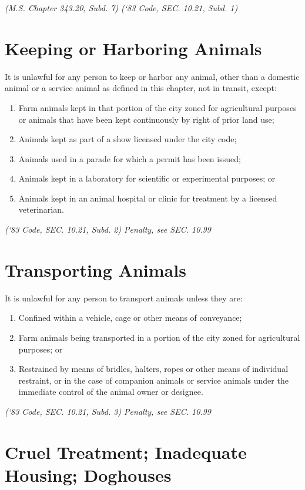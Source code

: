 \emph{(M.S. Chapter 343.20, Subd. 7)  (‘83 Code, SEC. 10.21, Subd. 1)}

\section{Keeping or Harboring Animals}
It is unlawful for any person to keep or harbor any animal, other than a domestic animal or a service animal as defined in this chapter, not in transit, except:
\begin{enumerate}[{\indent}A)]
    \item Farm animals kept in that portion of the city zoned for agricultural purposes or animals that have been kept continuously by right of prior land use;
    \item Animals kept as part of a show licensed under the city code;
    \item Animals used in a parade for which a permit has been issued;
    \item Animals kept in a laboratory for scientific or experimental purposes; or
    \item Animals kept in an animal hospital or clinic for treatment by a licensed veterinarian.
\end{enumerate}
\emph{(‘83 Code, SEC. 10.21, Subd. 2)  Penalty, see SEC. 10.99}

\section{Transporting Animals}
It is unlawful for any person to transport animals unless they are:
\begin{enumerate}[{\indent}A)]
    \item Confined within a vehicle, cage or other means of conveyance;
    \item Farm animals being transported in a portion of the city zoned for agricultural purposes; or
    \item Restrained by means of bridles, halters, ropes or other means of individual restraint, or in the case of companion animals or service animals under the immediate control of the animal owner or designee.
\end{enumerate}
\emph{(‘83 Code, SEC. 10.21, Subd. 3)  Penalty, see SEC. 10.99}

\section{Cruel Treatment; Inadequate Housing; Doghouses}
